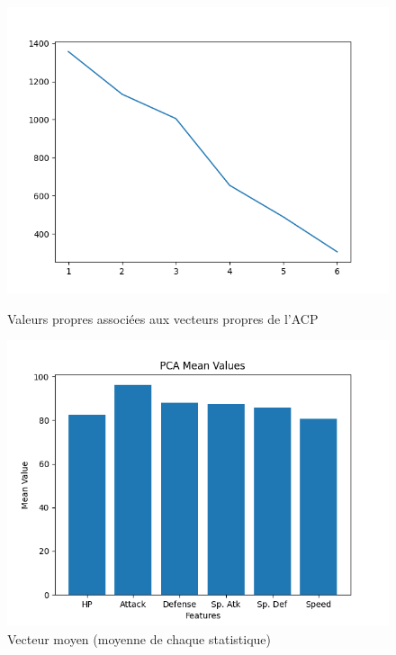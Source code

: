 \documentclass[a4paper,12pt]{article}
\begin{document}
\begin{figure}[htbp]
    \centering
    \begin{minipage}[b]{0.45\textwidth}
        \includegraphics[width=\textwidth]{Image/explained_variation_PCA.png}
        \caption{Valeurs propres associées aux vecteurs propres de l'ACP}
    \end{minipage}
    \hfill
    \begin{minipage}[b]{0.45\textwidth}
        \includegraphics[width=\textwidth]{Image/mean_vector_PCA.png}
        \caption{Vecteur moyen (moyenne de chaque statistique)}
    \end{minipage}
    
    \vspace{0.5cm}
    

\end{figure}
\end{document}
